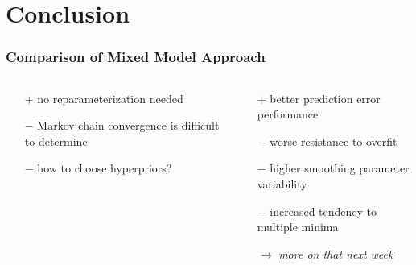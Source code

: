 \documentclass[final]{beamer}
\begin{document}
\section{Conclusion}


\begin{frame}
\frametitle{Comparison of Mixed Model Approach}
\begin{columns}[T]
\begin{column}{0.5\textwidth}
\centering{\textcolor{beamer@postercolour}{Fully Bayesian approach \\(MCMC)}}
\begin{itemize}
\item[$+$] no reparameterization needed
\item[$-$] Markov chain convergence is difficult to determine
\item[$-$] how to choose hyperpriors?
\end{itemize}
\end{column}
\begin{column}{0.5\textwidth}
\centering{\textcolor{beamer@postercolour}{Prediction error methods \\ (AIC, GCV)}}
\begin{itemize}
\item[$+$] better prediction error performance 
\item[$-$] worse resistance to overfit
\item[$-$] higher smoothing parameter variability
\item[$-$] increased tendency to multiple minima
\item[$\rightarrow$] \textit{more on that next week}
\end{itemize}
\end{column}
\end{columns}
\end{frame}






\end{document}
